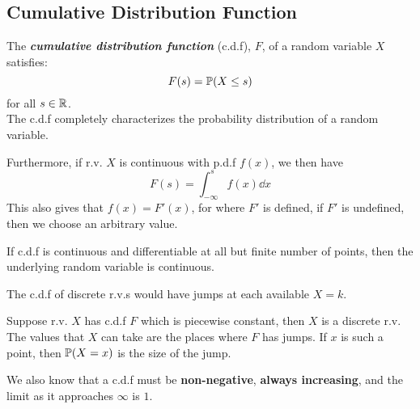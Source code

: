 \subsection{Cumulative Distribution Function}
\begin{definition}
    The \textbf{\textit{cumulative distribution function}} (c.d.f), $F$, of a random variable $X$ satisfies:
    $$F(s) = \mathbb{P}(X \le s)$$
    for all $s \in \mathbb{R}$. \\
    The c.d.f completely characterizes the probability distribution of a random variable.
\end{definition}
Furthermore, if r.v. $X$ is continuous with p.d.f $f(x)$, we then have
$$F(s) = \int_{-\infty}^{s} f(x) \dd x$$
This also gives that $f(x) = F'(x)$, for where $F'$ is defined, if $F'$ is undefined, then we choose an arbitrary value.
\begin{theorem}
    If c.d.f is continuous and differentiable at all but finite number of points, then the underlying random variable is continuous.
\end{theorem}
The c.d.f of discrete r.v.s would have jumps at each available $X = k$.
\begin{theorem}
    Suppose r.v. $X$ has c.d.f $F$ which is piecewise constant, then $X$ is a discrete r.v. The values that $X$ can take are the places where $F$ has jumps. If $x$ is such a point, then $\mathbb{P}(X = x)$ is the size of the jump.
\end{theorem}
We also know that a c.d.f must be \textbf{non-negative}, \textbf{always increasing}, and the limit as it approaches $\infty$ is $1$.

